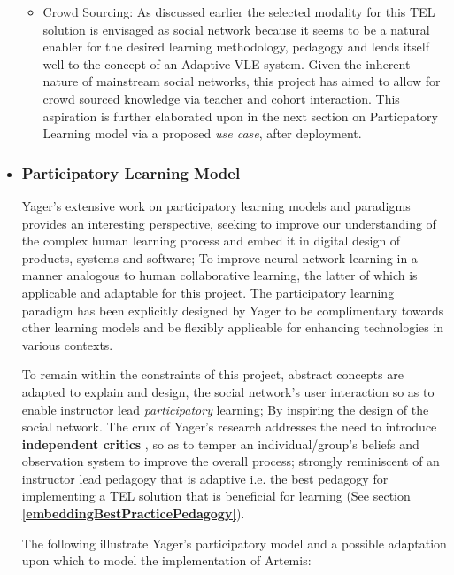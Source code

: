 \begin{itemize}[\null]
\begin{itemize}
        \item Crowd Sourcing: As discussed earlier the selected modality for this TEL solution is envisaged as social network because it seems to be a natural enabler for the desired learning methodology, pedagogy and lends itself well to the concept of an Adaptive VLE system. Given the inherent nature of mainstream social networks, this project has aimed to allow for crowd sourced knowledge via teacher and cohort interaction. This aspiration is further elaborated upon in the next section on Particpatory Learning model via a proposed \textit{use case}, after deployment.
    \end{itemize}
    
    
    \item \subsubsection{Participatory Learning Model}
    \label{participatoryLearningModel}
 
    Yager's \cite{Yager1990,Yager2004,Yager2004a} extensive work on participatory learning models and paradigms provides an interesting perspective, seeking to improve our understanding of the  complex human learning process and embed it in digital design of products, systems and software; To improve neural network learning in a manner analogous to human collaborative learning, the latter of which is applicable and adaptable for this project. The participatory learning paradigm has been explicitly designed by Yager \cite{Yager2004,Yager2004a} to be complimentary towards other learning models and be flexibly applicable for enhancing technologies in various contexts.
    
    To remain within the constraints of this project, abstract concepts are adapted to explain and design, the social network's user interaction so as to enable instructor lead \textit{participatory} learning; By inspiring the design of the social network. The crux of Yager's research addresses the need to introduce \textbf{independent critics} \cite{Yager2004a,Yager2004,Yager1990}, so as to temper an individual/group's beliefs and observation system \cite{Yager1990} to improve the overall  process; strongly reminiscent of an instructor lead pedagogy that is adaptive i.e. the best pedagogy for implementing a TEL solution that is beneficial for learning (See section \textbf{\ref{embeddingBestPracticePedagogy}}).
    
    The following illustrate Yager's participatory model and a possible adaptation upon which to model the implementation of Artemis:



\end{itemize}
